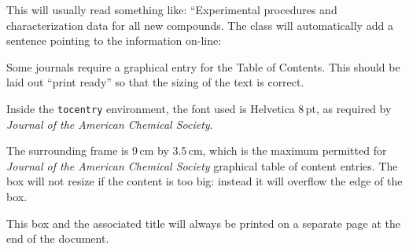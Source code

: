 \documentclass[english,journal=jctcce,manuscript=article,etalmode=truncate,maxauthors=0]{achemso}
\begin{document}
\begin{suppinfo}
	This will usually read something like: ``Experimental procedures and characterization data for all new compounds. The class will automatically add a sentence pointing to the information on-line:
\end{suppinfo}

\newpage %

\begin{tocentry}

Some journals require a graphical entry for the Table of Contents.
This should be laid out ``print ready'' so that the sizing of the
text is correct.

Inside the \texttt{tocentry} environment, the font used is Helvetica
8\,pt, as required by \emph{Journal of the American Chemical
Society}.

The surrounding frame is 9\,cm by 3.5\,cm, which is the maximum
permitted for  \emph{Journal of the American Chemical Society}
graphical table of content entries. The box will not resize if the
content is too big: instead it will overflow the edge of the box.

This box and the associated title will always be printed on a
separate page at the end of the document.

\end{tocentry}

%
%
\end{document}
